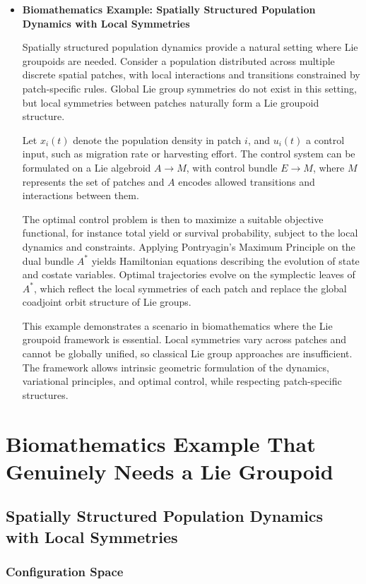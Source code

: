 \documentclass{article}
\begin{document}
\begin{itemize}
\item{\bf Biomathematics Example: Spatially Structured Population Dynamics with Local Symmetries}

Spatially structured population dynamics provide a natural setting where Lie groupoids are needed. Consider a population distributed across multiple discrete spatial patches, with local interactions and transitions constrained by patch-specific rules. Global Lie group symmetries do not exist in this setting, but local symmetries between patches naturally form a Lie groupoid structure.

Let $x_i(t)$ denote the population density in patch $i$, and $u_i(t)$ a control input, such as migration rate or harvesting effort. The control system can be formulated on a Lie algebroid $A \to M$, with control bundle $E \to M$, where $M$ represents the set of patches and $A$ encodes allowed transitions and interactions between them.

The optimal control problem is then to maximize a suitable objective functional, for instance total yield or survival probability, subject to the local dynamics and constraints. Applying Pontryagin's Maximum Principle on the dual bundle $A^*$ yields Hamiltonian equations describing the evolution of state and costate variables. Optimal trajectories evolve on the symplectic leaves of $A^*$, which reflect the local symmetries of each patch and replace the global coadjoint orbit structure of Lie groups.

This example demonstrates a scenario in biomathematics where the Lie groupoid framework is essential. Local symmetries vary across patches and cannot be globally unified, so classical Lie group approaches are insufficient. The framework allows intrinsic geometric formulation of the dynamics, variational principles, and optimal control, while respecting patch-specific structures.
\end{itemize}

\section{Biomathematics Example That Genuinely Needs a Lie Groupoid}

\subsection*{Spatially Structured Population Dynamics with Local Symmetries}

\subsubsection*{Configuration Space}
\end{document}
